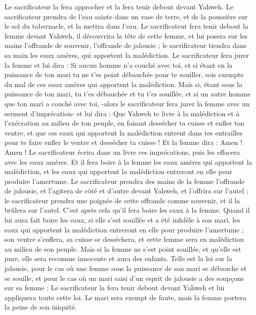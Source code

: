 \begin{multicols}{2}
Le sacrificateur la fera approcher et la fera tenir debout devant Yahweh.
Le sacrificateur prendra de l'eau sainte dans un vase de terre, et de la poussière sur le sol du tabernacle, et la mettra dans l'eau.
Le sacrificateur fera tenir debout la femme devant Yahweh, il découvrira la tête de cette femme, et lui posera sur les mains l’offrande de souvenir, l’offrande de jalousie ; le sacrificateur tiendra dans sa main les eaux amères, qui apportent la malédiction.
Le sacrificateur fera jurer la femme et lui dira : Si aucun homme n'a couché avec toi, et si étant en la puissance de ton mari tu ne t'es point débauchée pour te souiller, sois exempte du mal de ces eaux amères qui apportent la malédiction.
Mais si, étant sous la puissance de ton mari, tu t'es débauchée et tu t'es souillée, et si un autre homme que ton mari a couché avec toi,
-alors le sacrificateur fera jurer la femme avec un serment d'imprécation- et lui dira : Que Yahweh te livre à la malédiction et à l'exécration au milieu de ton peuple, en faisant dessécher ta cuisse et enfler ton ventre,
et que ces eaux qui apportent la malédiction entrent dans tes entrailles pour te faire enfler le ventre et dessécher ta cuisse ! Et la femme dira : Amen ! Amen !
Le sacrificateur écrira dans un livre ces imprécations, puis les effacera avec les eaux amères.
Et il fera boire à la femme les eaux amères qui apportent la malédiction, et les eaux qui apportent la malédiction entreront en elle pour produire l’amertume.
Le sacrificateur prendra des mains de la femme l’offrande de jalousie, et l’agitera de côté et d’autre devant Yahweh, et l'offrira sur l'autel ;
le sacrificateur prendra une poignée de cette offrande comme souvenir, et il la brûlera sur l'autel. C’est après cela qu’il fera boire les eaux à la femme.
Quand il lui aura fait boire les eaux, si elle s’est souillée et a été infidèle à son mari, les eaux qui apportent la malédiction entreront en elle pour produire l’amertume ; son ventre s’enflera, sa cuisse se desséchera, et cette femme sera en malédiction au milieu de son peuple.
Mais si la femme ne s'est point souillée, et qu'elle est pure, elle sera reconnue innocente et aura des enfants.
Telle est la loi sur la jalousie, pour le cas où une femme sous la puissance de son mari se débauche et se souille,
et pour le cas où un mari saisi d’un esprit de jalousie a des soupçons sur sa femme : Le sacrificateur la fera tenir debout devant Yahweh et lui appliquera toute cette loi.
Le mari sera exempt de faute, mais la femme portera la peine de son iniquité.

\end{multicols}
